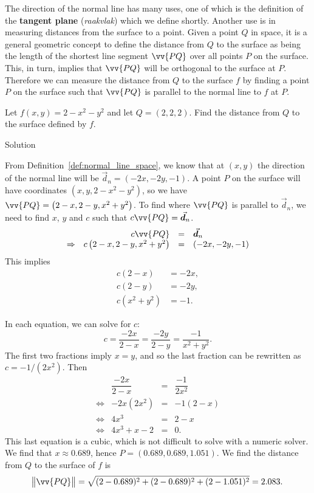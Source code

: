 The direction of the normal line has many uses, one of which is the definition of the \textbf{tangent plane} (\textit{raakvlak}) which we define shortly. Another use is in measuring distances from the surface to a point. Given a point $Q$ in space, it is a general geometric concept to define the distance from $Q$ to the surface as being the length of the shortest line segment $\vv{PQ}$ over all points $P$ on the surface. This, in turn, implies that $\vv{PQ}$ will be orthogonal to the surface at $P$. Therefore we can measure the distance from $Q$ to the surface $f$ by finding a point $P$ on the surface such that $\vv{PQ}$ is parallel to the normal line to $f$ at $P$.\\

\begin{example}\label{ex_tpl4}
Let $f(x,y) = 2-x^2-y^2$ and let $Q = (2,2,2)$. Find the distance from $Q$ to the surface defined by $f$.

Solution 

From Definition~\ref{def:normal_line_space}, we know that at $(x,y)$ the direction of the normal line will be $\vec d_n = \left( -2x,-2y,-1\right)$. A point $P$ on the surface will have coordinates $(x,y,2-x^2-y^2)$, so we have $\vv{PQ} = \left( 2-x,2-y,x^2+y^2\right)$. To find where $\vv{PQ}$ is parallel to $\vec d_n$, we need to find $x$, $y$ and $c$ such that $c\vv{PQ} = \vec d_n$.
$$\begin{array}{rrcl}
 &c\vv{PQ} &=& \vec d_n \\
\Rightarrow &c\left( 2-x,2-y,x^2+y^2\right) &=& \left( -2x,-2y,-1\right)
\end{array}$$
This implies
\begin{align*}
c(2-x) &= -2x,\\
c(2-y) &= -2y,\\
c(x^2+y^2) &= -1.
\end{align*}

In each equation, we can solve for $c$:
$$c = \frac{-2x}{2-x} = \frac{-2y}{2-y} = \frac{-1}{x^2+y^2}.$$
The first two fractions imply $x=y$, and so the last fraction can be rewritten as $c=-1/(2x^2)$. Then
$$\begin{array}{rrcl}
 & \dfrac{-2x}{2-x}& = & \dfrac{-1}{2x^2} \\[0.2cm]
\Leftrightarrow  & -2x(2x^2) & = & -1(2-x) \\[0.2cm]
\Leftrightarrow  & 4x^3 & = & 2-x\\[0.2cm]
\Leftrightarrow  & 4x^3+x-2 &= & 0.
\end{array}$$
This last equation is a cubic, which is not difficult to solve with a numeric solver. We find that $x\approx 0.689$, hence $P = (0.689,0.689, 1.051)$. We find the distance from $Q$ to the surface of $f$ is 
$$\norm{\vv{PQ}} = \sqrt{(2-0.689)^2 +(2-0.689)^2+(2-1.051)^2} = 2.083.$$ 
\end{example}


